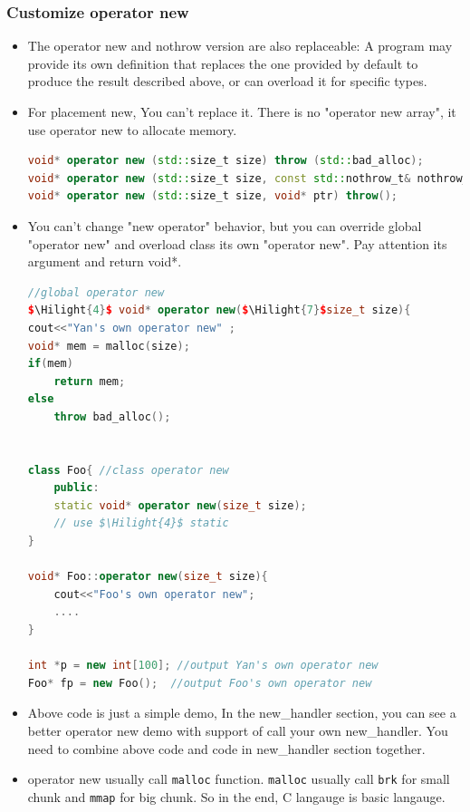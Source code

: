 \documentclass[a4paper,12pt,twoside]{book}
\newcommand{\Hilight}[1]{\makebox[0pt][l]{\color{yellow}\rule[-3pt]{#1em}{11pt}}}
\begin{document}
\subsubsection{Customize operator new}
\begin{itemize}
	\item The operator new and nothrow version are also replaceable: A program may provide its own definition that replaces the one provided by default to produce the result described above, or can overload it for specific types. 
	\item For placement new, You can't replace it. There is no "operator new array", it use operator new to allocate memory. 
\begin{lstlisting}[frame=single, language=c++]
void* operator new (std::size_t size) throw (std::bad_alloc);
void* operator new (std::size_t size, const std::nothrow_t& nothrow_value) throw();
void* operator new (std::size_t size, void* ptr) throw();
\end{lstlisting}
	
	\item You can't change "new operator" behavior, but you can override global "operator new" and overload class its own "operator new". Pay attention its argument and return void*. 
	
\begin{lstlisting}[frame=single, language=c++, mathescape=true]
//global operator new
$\Hilight{4}$ void* operator new($\Hilight{7}$size_t size){
cout<<"Yan's own operator new" ;
void* mem = malloc(size);
if(mem)
	return mem;
else
	throw bad_alloc();
	
	
class Foo{ //class operator new
	public:
	static void* operator new(size_t size);
	// use $\Hilight{4}$ static
}
	
void* Foo::operator new(size_t size){
	cout<<"Foo's own operator new";
	....
}
	
int *p = new int[100]; //output Yan's own operator new
Foo* fp = new Foo();  //output Foo's own operator new
\end{lstlisting}
	
	\item Above code is just a simple demo, In the new\_handler section, you can see a better operator new demo with support of call your own new\_handler. You need to combine above code and code in new\_handler section together. 
	
	\item operator new usually call \texttt{malloc} function. \texttt{malloc} usually call \texttt{brk} for small chunk and \texttt{mmap} for big chunk. So in the end, C langauge is basic langauge.
	

\end{itemize}
\end{document}
